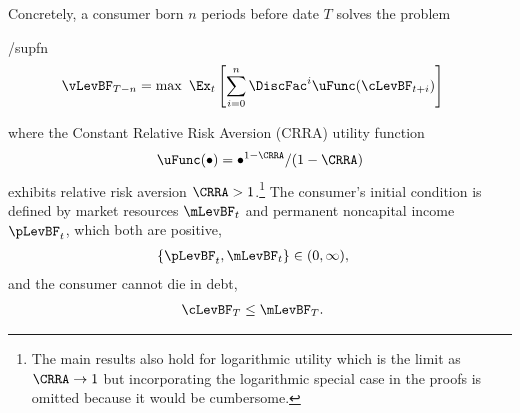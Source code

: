 \documentclass[BufferStockTheory]{subfiles}
\begin{document}
Concretely, a consumer born $n$ periods before date $T$ solves the problem
\begin{verbatimwrite}{\EqDir/supfn}
  \begin{align*}%
    \vLevBF_{T-n} & = \max~ \Ex_{t}\left[\sum_{i=0}^{n} \DiscFac^{i} \uFunc(\cLevBF_{t+i})\right]
  \end{align*}
\end{verbatimwrite}

where the Constant Relative Risk Aversion (CRRA) utility function
\begin{align}
  \uFunc(\bullet)=\bullet^{1-\CRRA}/(1-\CRRA) \label{eq:crrautil}
\end{align}
exhibits relative risk aversion $\CRRA > 1$.\footnote{The main
  results also hold for logarithmic utility which is the limit as
  $\CRRA \rightarrow 1$ but incorporating the logarithmic special case
  in the proofs is omitted because it would be cumbersome.}  The consumer's initial condition is
defined by market resources $\mLevBF_{t}$ and permanent noncapital income $\pLevBF_{t}$, which
both are positive,
\begin{align}
  \{\pLevBF_{t},\mLevBF_{t}\} & \in (0,\infty) \label{eq:pLevBFandmLevBFgt0},
\end{align}
and the consumer cannot die in debt,
\begin{align}
  \cLevBF_{T} & \leq  \mLevBF_{T} \label{eq:NoDebtAtDeath}.
\end{align}

\hypertarget{checkRestrictions}{}
\end{document}

